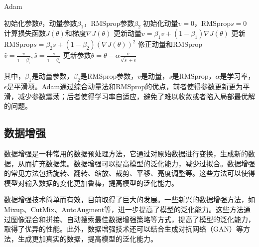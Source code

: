 \begin{algorithm}[H]
    \caption{Adam}
    \label{alg:adam}
    \begin{algorithmic}[1]
        \State 初始化参数$\theta$，动量参数$\beta_1$，RMSprop参数$\beta_2$
        \State 初始化动量$v = 0$，RMSprop$s = 0$
            \State 计算损失函数$J(\theta)$和梯度$\nabla J(\theta)$
            \State 更新动量$v = \beta_1 v + (1 - \beta_1) \nabla J(\theta)$
            \State 更新RMSprop$s = \beta_2 s + (1 - \beta_2) (\nabla J(\theta))^2$
            \State 修正动量和RMSprop$\hat{v} = \frac{v}{1 - \beta_1^t},\hat{s} = \frac{s}{1 - \beta_2^t}$
            \State 更新参数$\theta = \theta - \alpha \frac{\hat{v}}{\sqrt{\hat{s}} + \epsilon}$
        \EndWhile
    \end{algorithmic}
\end{algorithm}

其中，$\beta_1$是动量参数，$\beta_2$是RMSprop参数，$v$是动量，$s$是RMSprop，$\alpha$是学习率，$\epsilon$是平滑项。Adam通过综合动量法和RMSprop的优点，前者使得参数更新更为平滑，减少参数震荡；后者使得学习率自适应，避免了难以收敛或者陷入局部最优解的问题。

\subsection{数据增强}

数据增强是一种常用的数据预处理方法，它通过对原始数据进行变换，生成新的数据，从而扩充数据集。数据增强可以提高模型的泛化能力，减少过拟合。数据增强的常见方法包括旋转、翻转、缩放、裁剪、平移、亮度调整等。这些方法可以使得模型对输入数据的变化更加鲁棒，提高模型的泛化能力。

数据增强技术简单而有效，目前取得了巨大的发展。一些新兴的数据增强方法，如Mixup、CutMix、AutoAugment等，进一步提高了模型的泛化能力。这些方法通过图像混合和拼接、自动搜索最佳数据增强策略等方式，提高了模型的泛化能力，取得了优异的性能。此外，数据增强技术还可以结合生成对抗网络（GAN）等方法，生成更加真实的数据，提高模型的泛化能力。